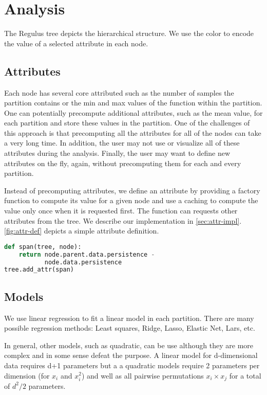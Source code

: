 \section{Analysis }
\label{sec:analysis}
The Regulus tree depicts the hierarchical structure. We use the color to encode the value of a selected attribute in each node. 
 
\subsection{Attributes}
Each node has several core attributed such as the number of samples the partition contains or the min and max values of the function within the partition. One can potentially precompute additional attributes, such as the mean value, for each partition and store these values in the partition. One of the challenges of this approach is that precomputing all the attributes for all of the nodes can take a very long time. In addition, the user may not use or visualize all of these attributes during the analysis. Finally, the user may want to define new attributes on the fly, again, without precomputing them for each and every partition. 

Instead of precomputing attributes, we define an attribute by providing a factory function to compute its value for a given node and use a caching to compute the value only once when it is requested first. The function can requests other attributes from the tree. We describe our implementation in \autoref{sec:attr-impl}. \autoref{fig:attr-def} depicts a simple attribute definition.

\begin{lstlisting}[language=Python, float=htb, label=fig:attr-def, caption=Attribute definition]
def span(tree, node):
    return node.parent.data.persistence -
           node.data.persistence
tree.add_attr(span)
\end{lstlisting}


\subsection{Models}
We use linear regression to fit a linear model in each partition. There are many possible regression methods: Least squares, Ridge, Lasso, Elastic Net, Lars, etc. 

In general, other models, such as quadratic, can be use although they are more complex and in some sense defeat the purpose. A linear model for d-dimensional data requires d+1 parameters but a a quadratic models require 2 parameters per dimension (for $x_i$ and $x_i^2$) and well as all pairwise permutations $x_i \times x_j$ for a total of $d^2/2$ parameters.


